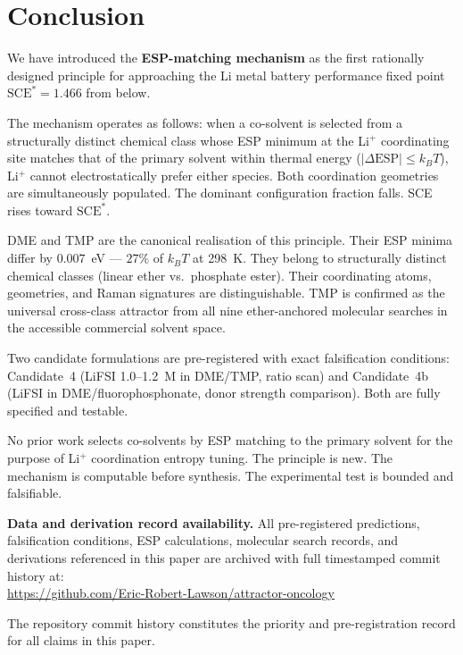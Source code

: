 \documentclass[11pt]{article}
\theoremstyle{plain}
\theoremstyle{definition}
\theoremstyle{remark}
\begin{document}
\section{Conclusion}

We have introduced the \textbf{ESP-matching mechanism} as the first
rationally designed principle for approaching the Li metal battery
performance fixed point $\mathrm{SCE}^{*} = 1.466$ from below.

The mechanism operates as follows: when a co-solvent is selected from a
structurally distinct chemical class whose ESP minimum at the Li$^+$
coordinating site matches that of the primary solvent within thermal
energy ($|\Delta\mathrm{ESP}| \leq k_BT$), Li$^+$ cannot electrostatically
prefer either species.  Both coordination geometries are simultaneously
populated.  The dominant configuration fraction falls.  SCE rises toward
$\mathrm{SCE}^{*}$.

DME and TMP are the canonical realisation of this principle.
Their ESP minima differ by $0.007$~eV --- $27\%$ of $k_BT$ at 298~K.
They belong to structurally distinct chemical classes (linear ether vs.\
phosphate ester).  Their coordinating atoms, geometries, and Raman
signatures are distinguishable.  TMP is confirmed as the universal
cross-class attractor from all nine ether-anchored molecular searches
in the accessible commercial solvent space.

Two candidate formulations are pre-registered with exact falsification
conditions: Candidate~4 (LiFSI 1.0--1.2~M in DME/TMP, ratio scan) and
Candidate~4b (LiFSI in DME/fluorophosphonate, donor strength comparison).
Both are fully specified and testable.

No prior work selects co-solvents by ESP matching to the primary solvent
for the purpose of Li$^+$ coordination entropy tuning.  The principle is
new.  The mechanism is computable before synthesis.  The experimental
test is bounded and falsifiable.

\bigskip
\noindent\textbf{Data and derivation record availability.}
All pre-registered predictions, falsification conditions, ESP calculations,
molecular search records, and derivations referenced in this paper are
archived with full timestamped commit history at:\\
\url{https://github.com/Eric-Robert-Lawson/attractor-oncology}

\noindent The repository commit history constitutes the priority and
pre-registration record for all claims in this paper.
\end{document}
